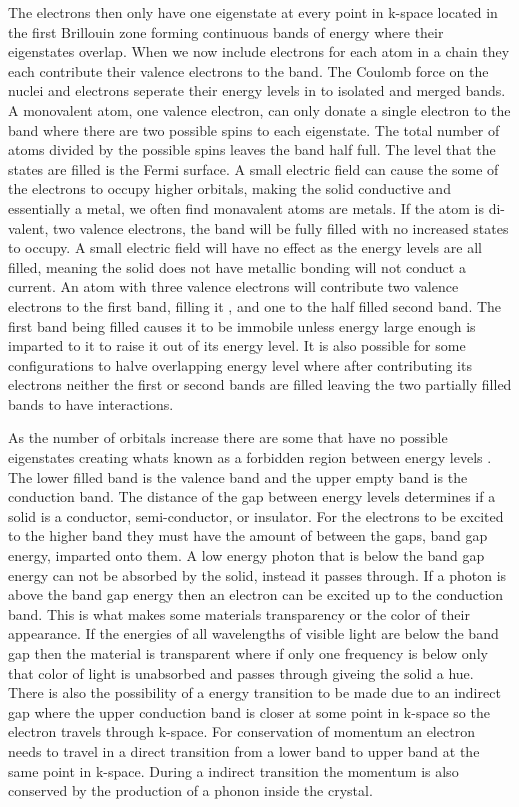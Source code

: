 \documentclass[prl,onecolumn]{revtex4-1}  %
\begin{document}
\par The electrons then only have one eigenstate at every point in k-space located in the first Brillouin zone forming continuous bands of energy where their eigenstates overlap. 
When we now include electrons for each atom in a chain they each contribute their valence electrons to the band. The Coulomb force on the nuclei and electrons seperate their energy levels in to isolated and merged bands\cite{Kittel}.  A monovalent atom, one valence electron, can only donate a single electron to the band where there are two possible spins to each eigenstate\cite{Simon}. The total number of atoms divided by the possible  spins leaves the band half full. The level that the states are filled is the Fermi surface. A small electric field can cause the some of the electrons to occupy higher orbitals, making the solid conductive and essentially a metal, we often find monavalent atoms are metals\cite{Simon}.  If the atom is di-valent, two valence electrons, the band will be fully filled with no increased states to occupy. A small electric field will have no effect as the energy levels are all filled, meaning the solid does not have metallic bonding will not conduct a current\cite{Simon}. An atom with three valence electrons will contribute two valence electrons to the first band, filling it , and one to the half filled second band. The first band being filled causes it to be immobile unless energy large enough is imparted to it to raise it out of its energy level\cite{Kittel}. It is also possible for some configurations to halve overlapping energy level where after contributing its electrons neither the first or second bands are filled leaving the two partially filled bands to have interactions. 
\par
As the number of orbitals increase there are some that have no possible eigenstates creating whats known as a forbidden region between energy levels \cite{Levitin}. The lower filled band is the valence band and the upper empty band is the conduction band. The distance of the gap between energy levels determines if a solid is a conductor, semi-conductor, or insulator. For the electrons to be excited to the higher band they must have the amount of between the gaps, band gap energy, imparted onto them. A low energy photon that is below the band gap energy  can not be absorbed by the solid, instead it passes through. If a photon is above the band gap energy then an electron can be excited up to the conduction band. This is what makes some materials transparency or the color of their appearance. If the energies of all wavelengths of visible light are below the band gap then the material is transparent where if only one frequency is below only that color of light is unabsorbed and passes through giveing the solid a hue\cite{Simon}. There is also the possibility of a energy transition to be made due to an indirect gap where the upper conduction band is closer at some point in k-space so the electron travels through k-space. For conservation of momentum an electron needs to travel in a direct transition from a lower band to upper band at the same point in k-space. During a indirect transition the momentum is also conserved by the production of a phonon inside the crystal. \cite{Simon} 
\end{document}
